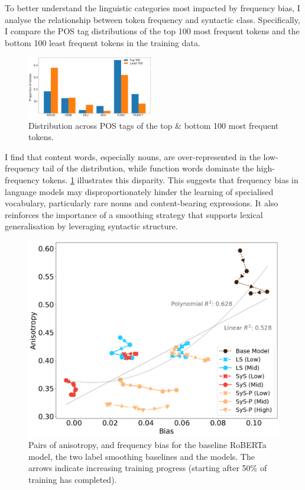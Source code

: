 To better understand the linguistic categories most impacted by frequency bias, I analyse the relationship between token frequency and syntactic class. Specifically, I compare the POS tag distributions of the top 100 most frequent tokens and the bottom 100 least frequent tokens in the training data. 

\begin{figure}
    \centering
    \includegraphics[width=0.49\textwidth]{chapters/syntatic-smoothing/figures/top_versus_bottom_pos_dist.pdf}
    \caption{Distribution across POS tags of the top \& bottom 100 most frequent tokens.}
    \label{fig:top-100-pos-dist}
\end{figure}

I find that content words, especially nouns, are over-represented in the low-frequency tail of the distribution, while function words dominate the high-frequency tokens. \cref{fig:top-100-pos-dist} illustrates this disparity. This suggests that frequency bias in language models may disproportionately hinder the learning of specialised vocabulary, particularly rare nouns and content-bearing expressions. It also reinforces the importance of a smoothing strategy that supports lexical generalisation by leveraging syntactic structure.

\begin{figure}[ht!]
    \centering
    \includegraphics[width=0.75\linewidth]{chapters/syntatic-smoothing/figures/bias-vs-anisotropy.png}
    \caption{Pairs of anisotropy, and frequency bias for the baseline RoBERTa model, the two label smoothing baselines and the \smoothing models. The arrows indicate increasing training progress (starting after 50\% of training has completed).}
    \label{fig:bias-anisotropy-correlation}
\end{figure}


